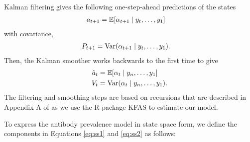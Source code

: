 Kalman filtering gives the following one-step-ahead predictions of the states
\begin{align*}
a_{t+1} &= \mathbb{E}[\alpha_{t+1}\mid y_t, \dots, y_1] 
\end{align*} with covariance,
\begin{align*}
P_{t+1} &= \operatorname{Var}(\alpha_{t+1} \mid y_t, \dots, y_1).
\end{align*}
Then, the Kalman smoother works backwards to the first time to give
\begin{align}
\hat{a}_t &= \mathbb{E}[\alpha_{t}\mid y_n, \dots, y_1] \label{eq:hatat}\\
V_t &= \operatorname{Var}(\alpha_{t}\mid y_n, \dots, y_1). \label{eq:Vt}
\end{align}
The filtering and smoothing steps are based on recursions that are described in
Appendix A of \citep{helske2017kfas} as we use the R package KFAS to estimate
our model.


To express the antibody prevalence model in state space form, we define
 the components in Equations \ref{eq:ss1} and \ref{eq:ss2} as follows:


